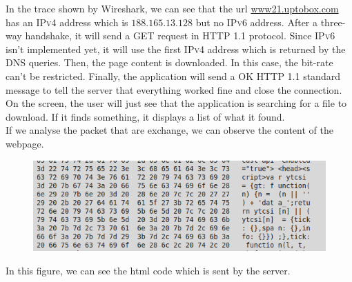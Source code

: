 \documentclass[journal]{IEEEtran}
\begin{document}
In the trace shown by Wireshark, we can see that the url \url{www21.uptobox.com} has an \textsc{IPv4} address which is $188.165.13.128$ but no \textsc{IPv6} address. 
After a three-way handshake, it will send a \textsc{GET} request in \textsc{HTTP 1.1} protocol. Since \textsc{IPv6} isn't implemented yet, it will use the first \textsc{IPv4} address which is returned by the DNS queries. Then, the page content is downloaded. In this case, the bit-rate can't be restricted. Finally, the application will send a \textsc{OK HTTP 1.1} standard message to tell the server that everything worked fine and close the connection. On the screen, the user will just see that the application is searching for a file to download. If it finds something, it displays a list of what it found. \\
If we analyse the packet that are exchange, we can observe the content of the webpage.\\
\begin{figure}[ht]

\includegraphics[scale=0.36]{htmlcode.png}
\end{figure}
In this figure, we can see the html code which is sent by the server.

\end{document}
